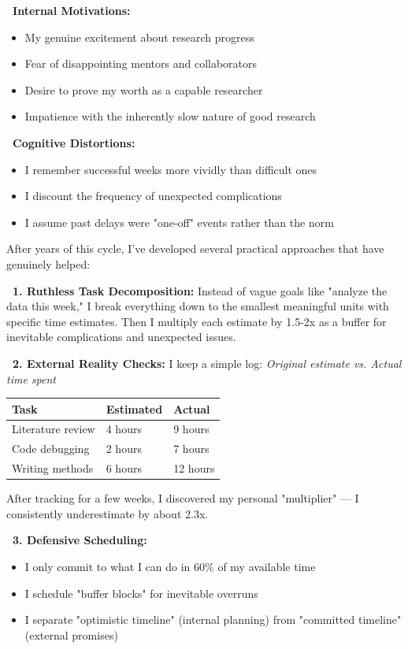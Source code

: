 \documentclass[11pt,a4paper]{article}
\begin{document}
\textbf{\faHeart~Internal Motivations:}
\begin{itemize}[leftmargin=1.5em]
    \item My genuine excitement about research progress
    \item Fear of disappointing mentors and collaborators
    \item Desire to prove my worth as a capable researcher
    \item Impatience with the inherently slow nature of good research
\end{itemize}

\textbf{\faBrain~Cognitive Distortions:}
\begin{itemize}[leftmargin=1.5em]
    \item I remember successful weeks more vividly than difficult ones
    \item I discount the frequency of unexpected complications
    \item I assume past delays were "one-off" events rather than the norm
\end{itemize}

\begin{tcolorbox}[colback=green!5,colframe=green!50,title={\faTools~My Strategies for Change}]
After years of this cycle, I've developed several practical approaches that have genuinely helped:

\textbf{\faList~1. Ruthless Task Decomposition:}
Instead of vague goals like "analyze the data this week," I break everything down to the smallest meaningful units with specific time estimates. Then I multiply each estimate by 1.5-2x as a buffer for inevitable complications and unexpected issues.

\textbf{\faDatabase~2. External Reality Checks:}
I keep a simple log: \textit{Original estimate vs. Actual time spent}
\begin{center}
\begin{tabular}{p{4cm}|p{3cm}|p{3cm}}
\toprule
\textbf{Task} & \textbf{Estimated} & \textbf{Actual} \\
\midrule
Literature review & 4 hours & 9 hours \\
Code debugging & 2 hours & 7 hours \\
Writing methods & 6 hours & 12 hours \\
\bottomrule
\end{tabular}
\end{center}
After tracking for a few weeks, I discovered my personal "multiplier" — I consistently underestimate by about 2.3x.

\textbf{\faCalendarCheck~3. Defensive Scheduling:}
\begin{itemize}[leftmargin=1.5em]
    \item I only commit to what I can do in 60\% of my available time
    \item I schedule "buffer blocks" for inevitable overruns
    \item I separate "optimistic timeline" (internal planning) from "committed timeline" (external promises)
\end{itemize}
\end{tcolorbox}
\end{document}
